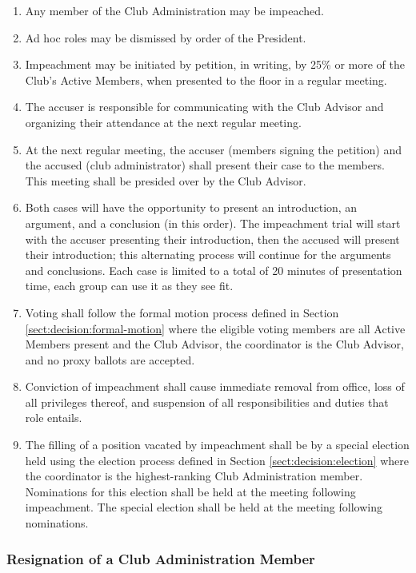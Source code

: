 \documentclass[english,11pt]{article}
\begin{document}
\begin{enumerate}[label=\alph*.]
    \item Any member of the Club Administration may be impeached.
    \item Ad hoc roles may be dismissed by order of the President.
    \item Impeachment may be initiated by petition, in writing, by 25\% or more of the Club's Active Members, when presented to the floor in a regular meeting.
    \item The accuser is responsible for communicating with the Club Advisor and organizing their attendance at the next regular meeting.
    \item At the next regular meeting, the accuser (members signing the petition) and the accused (club administrator) shall present their case to the members.
        This meeting shall be presided over by the Club Advisor.
    \item Both cases will have the opportunity to present an introduction, an argument, and a conclusion (in this order).
        The impeachment trial will start with the accuser presenting their introduction, then the accused will present their introduction; this alternating process will continue for the arguments and conclusions.
        Each case is limited to a total of 20 minutes of presentation time, each group can use it as they see fit.
    \item Voting shall follow the formal motion process defined in Section \ref{sect:decision:formal-motion} where the eligible voting members are all Active Members present and the Club Advisor, the coordinator is the Club Advisor, and no proxy ballots are accepted. 
    \item Conviction of impeachment shall cause immediate removal from office, loss of all privileges thereof, and suspension of all responsibilities and duties that role entails.
    \item The filling of a position vacated by impeachment shall be by a special election held using the election process defined in Section \ref{sect:decision:election} where the coordinator is the highest-ranking Club Administration member.
        Nominations for this election shall be held at the meeting following impeachment.
        The special election shall be held at the meeting following nominations.
\end{enumerate}

\subsubsection{Resignation of a Club Administration Member} \label{subsect:cadmin:removal:resignation}
\end{document}
